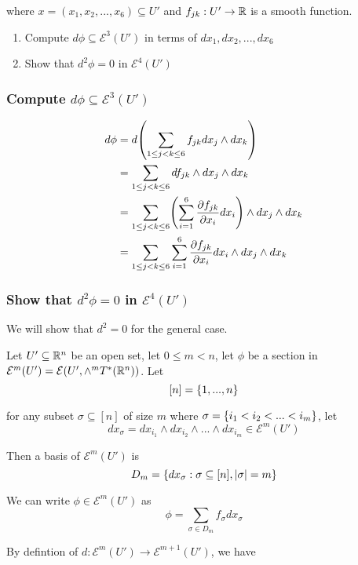 \documentclass{article}
\begin{document}
where $x = (x_1, x_2, ..., x_6) \subseteq U'$ and $f_{jk}: U' \to \mathbb{R}$ is a smooth function.

\begin{enumerate}
    \item Compute $d \phi \subseteq \mathcal{E}^3(U')$ in terms of $dx_1, dx_2, ..., dx_6$

    \item Show that $d^2 \phi = 0$ in $\mathcal{E}^4(U')$
\end{enumerate}

\subsubsection{Compute $d \phi \subseteq \mathcal{E}^3(U')$}

\begin{align*}
    d\phi
    &= d\tuple*{\sum_{1 \leq j < k \leq 6} f_{jk} dx_j \wedge dx_k} \\
    &= \sum_{1 \leq j < k \leq 6} d f_{jk} \wedge dx_j \wedge dx_k \\
    &= \sum_{1 \leq j < k \leq 6} \tuple*{\sum_{i=1}^6 \frac{\partial f_{jk}}{\partial x_i} dx_i} \wedge dx_j \wedge dx_k \\
    &= \sum_{1 \leq j < k \leq 6} \sum_{i=1}^6 \frac{\partial f_{jk}}{\partial x_i} dx_i \wedge dx_j \wedge dx_k
\end{align*}

\subsubsection{Show that $d^2 \phi = 0$ in $\mathcal{E}^4(U')$}

We will show that $d^2 = 0$ for the general case.

Let $U' \subseteq \mathbb{R}^n$ be an open set, let $0 \leq m < n$, let $\phi$ be a section in $\mathcal{E}^m(U') = \mathcal{E}(U', \wedge^m T^*(\mathbb{R}^n))$. Let 
$$
    [n] = \{1, ..., n\}
$$

for any subset $\sigma \subseteq [n]$ of size $m$ where $\sigma = \{i_1 < i_2 < ... < i_m\}$, let
$$
    dx_\sigma = dx_{i_1} \wedge dx_{i_2} \wedge ... \wedge dx_{i_m} \in \mathcal{E}^m(U')
$$

Then a basis of $\mathcal{E}^m(U')$ is
$$
    D_m =\{dx_\sigma: \sigma \subseteq [n], |\sigma| = m\}
$$

We can write $\phi \in \mathcal{E}^m(U')$ as 
$$
    \phi = \sum_{\sigma \in D_m} f_\sigma dx_\sigma
$$

By defintion of $d: \mathcal{E}^m(U') \to \mathcal{E}^{m+1}(U')$, we have
\end{document}
